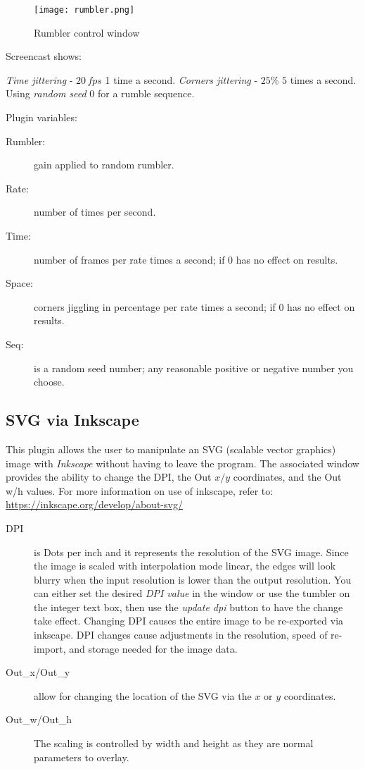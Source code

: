 \begin{figure}[hbtp]
    \centering
    \texttt{[image: rumbler.png]}
    \caption{Rumbler control window}
    \label{fig:rumbler}
\end{figure}

Screencast shows:

\textit{Time jittering} - $20\, fps$ 1 time a second.
\textit{Corners jittering} - $25\%$  $5$ times a second.
Using \textit{random seed} $0$ for a rumble sequence.

Plugin variables:

\begin{description}
    \item[Rumbler:] gain applied to random rumbler.
    \item[Rate:] number of times per second.
    \item[Time:] number of frames per rate times a second; if 0 has no effect on results.
    \item[Space:] corners jiggling in percentage per rate times a second; if 0 has no effect on results.
    \item[Seq:] is a random seed number; any reasonable positive or negative number you choose.
\end{description}

\subsection{SVG via Inkscape}%
\label{sub:svg_via_inkscape}

This plugin allows the user to manipulate an SVG (scalable vector graphics) image with \textit{Inkscape} without having to leave the program. The associated \CGG{} window provides the ability to change the DPI, the Out $x/y$ coordinates, and the Out w/h values. For more information on use of inkscape, refer to: {\small \url{https://inkscape.org/develop/about-svg/}}

\begin{description}
    \item[DPI] is Dots per inch and it represents the resolution of the SVG image. Since the image is scaled with interpolation mode linear, the edges will look blurry when the input resolution is lower than the output resolution. You can either set the desired \textit{DPI value} in the window or use the tumbler on the integer text box, then use the \textit{update dpi} button to have the change take effect. Changing DPI causes the entire image to be re-exported via inkscape. DPI changes cause adjustments in the resolution, speed of re-import, and storage needed for the image data.
    \item[Out\_x/Out\_y] allow for changing the location of the SVG via the $x$ or $y$ coordinates.
    \item[Out\_w/Out\_h]  The scaling is controlled by width and height as they are normal parameters to overlay.
\end{description}

